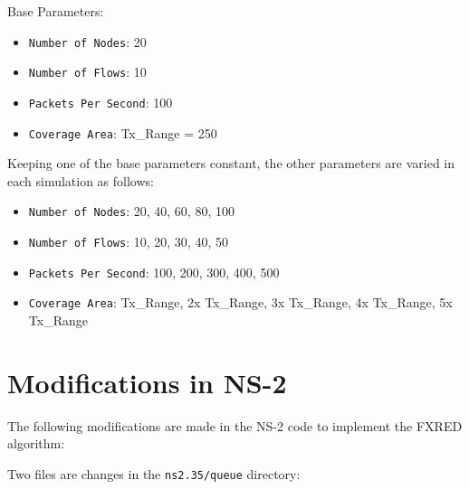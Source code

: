 \documentclass[10pt]{report}
\begin{document}
Base Parameters:

\begin{itemize}
  \item \texttt{Number of Nodes}: 20
  \item \texttt{Number of Flows}: 10
  \item \texttt{Packets Per Second}: 100
  \item \texttt{Coverage Area}: Tx\_Range = 250
\end{itemize}

Keeping one of the base parameters constant, the other parameters are varied in each simulation as follows:

\begin{itemize}
  \item \texttt{Number of Nodes}: 20, 40, 60, 80, 100
  \item \texttt{Number of Flows}: 10, 20, 30, 40, 50
  \item \texttt{Packets Per Second}: 100, 200, 300, 400, 500
  \item \texttt{Coverage Area}: Tx\_Range, 2x Tx\_Range, 3x Tx\_Range, 4x Tx\_Range, 5x Tx\_Range
\end{itemize}

\section*{Modifications in NS-2}
The following modifications are made in the NS-2 code to implement the FXRED algorithm:

Two files are changes in the \texttt{ns2.35/queue} directory:
\end{document}
